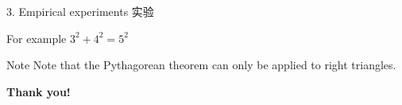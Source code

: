 \documentclass[CJKutf8]{beamer}
\begin{document}
\begin{CJK*}{UTF8}{gbsn}
\begin{frame}{3. Empirical experiments 实验}
      \begin{exampleblock}{For example}
        $3^2 + 4^2 = 5^2$
      \end{exampleblock}

      \begin{alertblock}{Note}
         Note that the Pythagorean theorem can only be applied to right triangles.
      \end{alertblock}
  \end{frame} %

  \begin{frame}
    \begin{center}
      \Huge{\bf{Thank you!}}
    \end{center}
  \end{frame} %


\end{CJK*}
\end{document}
